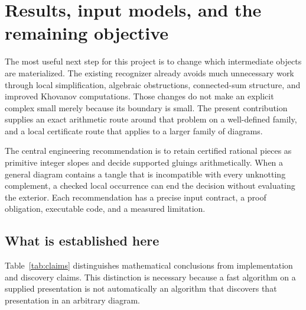 \section{Results, input models, and the remaining objective}
\label{sec:scope}

The most useful next step for this project is to change which intermediate
objects are materialized. The existing recognizer already avoids much
unnecessary work through local simplification, algebraic obstructions,
connected-sum structure, and improved Khovanov computations. Those changes
do not make an explicit complex small merely because its boundary is small.
The present contribution supplies an exact arithmetic route around that
problem on a well-defined family, and a local certificate route that applies
to a larger family of diagrams.

The central engineering recommendation is to retain certified rational
pieces as primitive integer slopes and decide supported gluings arithmetically.
When a general diagram contains a tangle that is incompatible with every
unknotting complement, a checked local occurrence can end the decision
without evaluating the exterior. Each recommendation has a precise input
contract, a proof obligation, executable code, and a measured limitation.

\subsection{What is established here}

Table~\ref{tab:claims} distinguishes mathematical conclusions from
implementation and discovery claims. This distinction is necessary because
a fast algorithm on a supplied presentation is not automatically an algorithm
that discovers that presentation in an arbitrary diagram.

